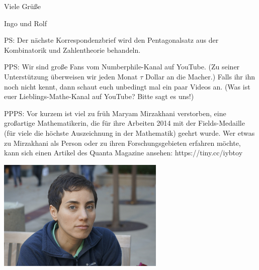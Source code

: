 \documentclass{anschreiben}
\begin{document}
\enlargethispage{2em}
Viele Grüße

Ingo und Rolf

PS: Der nächste Korrespondenzbrief wird den Pentagonalsatz aus der Kombinatorik
und Zahlentheorie behandeln.

PPS: Wir sind große Fans vom Numberphile-Kanal auf YouTube. (Zu seiner
Unterstützung überweisen wir jeden Monat $\tau$ Dollar an die Macher.) Falls
ihr ihn noch nicht kennt, dann schaut euch unbedingt mal ein paar Videos an.
(Was ist euer Lieblings-Mathe-Kanal auf YouTube? Bitte sagt es uns!)

PPPS: Vor kurzem ist viel zu früh Maryam Mirzakhani verstorben, eine großartige
Mathematikerin, die für ihre Arbeiten 2014 mit der Fields-Medaille (für viele
die höchste Auszeichnung in der Mathematik) geehrt wurde. Wer etwas zu
Mirzakhani als Person oder zu ihren Forschungsgebieten erfahren möchte, kann
sich einen Artikel des Quanta Magazine ansehen: https://tiny.cc/iybtoy

\begin{center}
  \includegraphics[width=0.6\textwidth]{mirzakhani}
\end{center}

\newpage
\fi\ifmore\repeat

\closein\quelle
\end{document}
